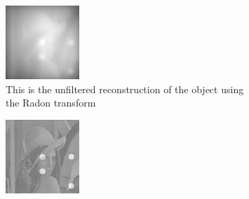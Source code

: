 \begin{figure}
  \centering
   \hspace*{\fill}
  \begin{subfigure}[t]{0.3\textwidth}
    \includegraphics[width=\textwidth]{./figures/results/no_helix/iradon_nofilter}
    \caption[Unfiltered iRadon]{This is the unfiltered reconstruction of the object using the \gls{Radon transform}}%
    \label{fig:iradon_nofilter}
  \end{subfigure}\hfill
  \begin{subfigure}[t]{0.3\textwidth}
    \includegraphics[width=\textwidth]{./figures/results/no_helix/iradon_filter}

\end{subfigure}
\end{figure}
